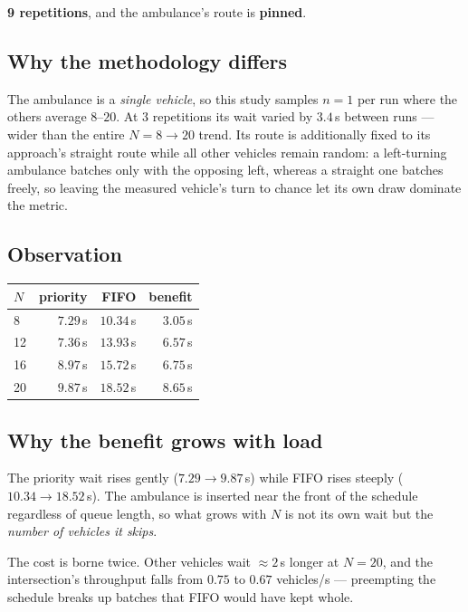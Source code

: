 \documentclass[11pt,a4paper]{article}
\begin{document}
\textbf{9 repetitions}, and the ambulance's route is \textbf{pinned}.

\subsection*{Why the methodology differs}

The ambulance is a \emph{single vehicle}, so this study samples $n{=}1$ per run
where the others average $8$--$20$. At 3 repetitions its wait varied by
$3.4$\,s between runs --- wider than the entire $N{=}8 \to 20$ trend. Its route
is additionally fixed to its approach's straight route while all other vehicles
remain random: a left-turning ambulance batches only with the opposing left,
whereas a straight one batches freely, so leaving the measured vehicle's turn to
chance let its own draw dominate the metric.

\subsection*{Observation}

\begin{center}
\begin{tabular}{lrrr}
\toprule
$N$ & priority & FIFO & benefit \\
\midrule
8  & $7.29$\,s & $10.34$\,s & $3.05$\,s \\
12 & $7.36$\,s & $13.93$\,s & $6.57$\,s \\
16 & $8.97$\,s & $15.72$\,s & $6.75$\,s \\
20 & $9.87$\,s & $18.52$\,s & $8.65$\,s \\
\bottomrule
\end{tabular}
\end{center}

\subsection*{Why the benefit grows with load}

The priority wait rises gently ($7.29 \to 9.87$\,s) while FIFO rises steeply
($10.34 \to 18.52$\,s). The ambulance is inserted near the front of the schedule
regardless of queue length, so what grows with $N$ is not its own wait but the
\emph{number of vehicles it skips}.

The cost is borne twice. Other vehicles wait ${\approx}2$\,s longer at $N{=}20$,
and the intersection's throughput falls from $0.75$ to $0.67$ vehicles/s ---
preempting the schedule breaks up batches that FIFO would have kept whole.
\end{document}
